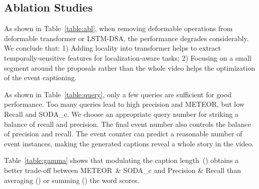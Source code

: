 \subsection{Ablation Studies}

 As shown in Table~\ref{table:abl}, when removing deformable operations from deformable transformer or LSTM-DSA, the performance degrades considerably. We conclude that: 1) Adding locality into transformer helps to extract temporally-sensitive features for localization-aware tasks; 2) Focusing on a small segment around the proposals rather than the whole video helps the optimization of the event captioning.

\vspace{0.5em}
 As shown in Table~\ref{table:query}, only a few queries are sufficient for good performance. Too many queries lead to high precision and  METEOR, but low Recall and SODA\_c. We choose an appropriate query number for striking a balance of recall and precision. The final event number also controls the balance of precision and recall. The event counter can predict a reasonable number of event instances, making the generated captions reveal a whole story in the video.


\vspace{0.5em}
 Table~\ref{table:gamma} shows that modulating the caption length~() obtains a better trade-off between METEOR\ \& SODA\_c and Precision \& Recall than averaging () or summing () the word scores. 

